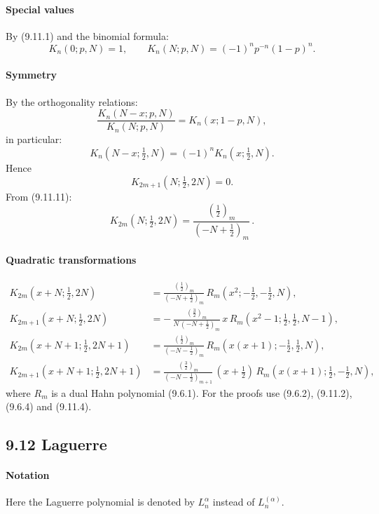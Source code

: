 \documentclass[twoside,11pt]{article}
\newcommand\al\alpha
\newcommand\thalf{\tfrac12}
\begin{document}
\paragraph{Special values}
By (9.11.1) and the binomial formula:
\begin{equation}
K_n(0;p,N)=1,\qquad
K_n(N;p,N)=(-1)^n p^{-n}(1-p)^n.
\label{9}
\end{equation}
%
\paragraph{Symmetry}
By the orthogonality relations:
\begin{equation}
\frac{K_n(N-x;p,N)}{K_n(N;p,N)}=K_n(x;1-p,N),
\label{10}
\end{equation}
in particular:
\begin{equation}
K_n(N-x;\thalf,N)=(-1)^n K_n(x;\thalf,N).
\label{11}
\end{equation}
Hence
\begin{equation}
K_{2m+1}(N;\thalf,2N)=0.
\label{12}
\end{equation}
From (9.11.11):
\begin{equation}
K_{2m}(N;\thalf,2N)=\frac{(\thalf)_m}{(-N+\thalf)_m}\,.
\label{13}
\end{equation}
%
\paragraph{Quadratic transformations}
\begin{align}
K_{2m}(x+N;\thalf,2N)&=\frac{(\thalf)_m}{(-N+\thalf)_m}\,
R_m(x^2;-\thalf,-\thalf,N),
\label{31}\\
K_{2m+1}(x+N;\thalf,2N)&=-\,\frac{(\tfrac32)_m}{N\,(-N+\thalf)_m}\,
x\,R_m(x^2-1;\thalf,\thalf,N-1),
\label{33}\\
K_{2m}(x+N+1;\thalf,2N+1)&=\frac{(\tfrac12)_m}{(-N-\thalf)_m}\,
R_m(x(x+1);-\thalf,\thalf,N),
\label{32}\\
K_{2m+1}(x+N+1;\thalf,2N+1)&=\frac{(\tfrac32)_m}{(-N-\thalf)_{m+1}}\,
(x+\thalf)\,R_m(x(x+1);\thalf,-\thalf,N),
\label{34}
\end{align}
where $R_m$ is a dual Hahn polynomial (9.6.1). For the proofs use
(9.6.2), (9.11.2), (9.6.4) and (9.11.4).
%
\subsection*{9.12 Laguerre}
\paragraph{Notation}
Here the Laguerre polynomial is denoted by $L_n^\al$ instead of
$L_n^{(\al)}$.
%
\end{document}
